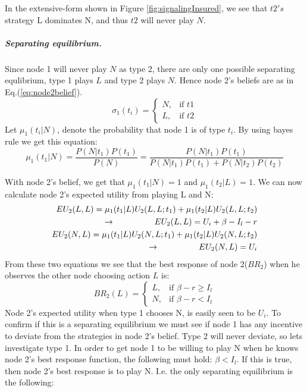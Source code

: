 In the extensive-form shown in Figure \ref{fig:signalingInsured}, we see that $t2's$ strategy L dominates N, and thus $t2$ will never play $N$.
\subparagraph{Separating equilibrium.}
Since node 1 will never play $N$ as type 2, there are only one possible separating equlibrium, type 1 plays $L$ and type 2 plays $N$. Hence node 2's beliefs are as in Eq.(\ref{eq:node2belief}).
\begin{equation}
    \sigma_{1}(t_{i})= 
\begin{cases}
   N,& \text{if } t1\\
   L,& \text{if } t2  
\end{cases}
\label{eq:node2belief}
\end{equation}
Let $\mu_{1}(t_{i} | N )$, denote the probability that node 1 is of type $t_{i}$. By using bayes rule we get this equation:
\begin{equation}
\mu_{1}(t_{1} | N )=\frac{P(N|t_{1})P(t_{1})}{P(N)}=\frac{P(N|t_{1})P(t_{1})}{P(N|t_{1})P(t_{1})+P(N|t_{2})P(t_{2})}
\end{equation}

With node 2's belief, we get that $\mu_{1}(t_{1} | N )=1$ and $\mu_{1}(t_{2} | L )= 1 $. We can now calculate node 2's expected utility from playing L and N:
\begin{eqnarray}
EU_{2}(L,L)=\mu_{1}(t_{1} | L )U_{2}(L,L;t_{1})+\mu_{1}(t_{2} | L )U_{2}(L,L;t_{2}) \nonumber\\
\llap{$\rightarrow$\hspace{50pt}}EU_{2}(L,L)=U_{i}+\beta-I_{l}-r \\
EU_{2}(N,L)=\mu_{1}(t_{1} | L )U_{2}(N,L;t_{1})+\mu_{1}(t_{2} | L )U_{2}(N,L;t_{2})\nonumber\\
\llap{$\rightarrow$\hspace{50pt}}EU_{2}(N,L)=U_{i}
\end{eqnarray}
From these two equations we see that the best response of node 2($BR_2$) when he observes the other node choosing action $L$ is:
\begin{equation}
BR_{2}(L)=
\begin{cases}
L, & \text{if }\beta - r \geq I_{l}\\
N, & \text{if } \beta -r<I_{l}
\end{cases}
\label{eq:insuredBR}
\end{equation}
Node 2's expected utility when type 1 chooses N, is easily seen to be $U_{i}$. 
To confirm if this is a separating equilibrium we must see if node 1 has any incentive to deviate from the strategies in node 2's belief.
Type 2 will never deviate, so lets investigate type 1.
In order to get node 1 to be willing to play N when he knows node 2's best response function, the following must hold: $\beta<I_{l}$. If this is true, then node 2's best response is to play N. I.e. the only separating equilibrium is the following:

